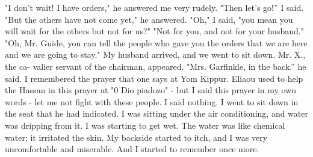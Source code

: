 "I don't wait! I have orders," he answered me very rudely. 
"Then let's go!” I said. 
"But the others have not come yet," he answered. 
"Oh," I said, "you mean you will wait for the others but not for 
us?" 
"Not for you, and not for your husband." 
"Oh, Mr. Guide, you can tell the people who gave you the orders that 
we are here and we are going to stay." 
My husband arrived, and we went to sit down. Mr. X., the ca-
valier servant of the chairman, appeared. "Mrs. Garfinkle, in the back.” 
he said. I remembered the prayer that one says at Yom Kippur. Eliaou 
used to help the Hassan in this prayer at "0 Dio piadozo" - but I said 
this prayer in my own words - let me not fight with these people. I said 
nothing. 
I went to sit down in the seat that he had indicated. I was sitting under the air conditioning, and water was dripping from it. I was starting to get wet. The water was like chemical water; it irritated 
the skin. My backside started to itch, and I was very uncomfortable 
and miserable. And I started to remember once more. 

